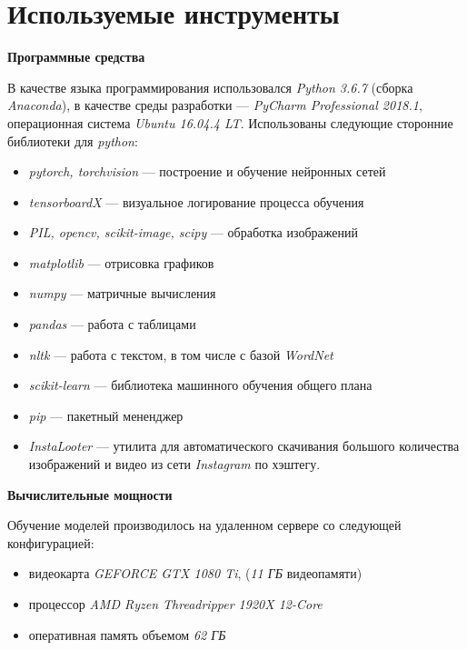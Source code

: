 \section{Используемые инструменты}

\textbf{Программные средства}

\indent
В качестве языка программирования использовался
 \textit{Python 3.6.7} (сборка \textit{Anaconda}),
 в качестве среды разработки --- \textit{PyCharm Professional 2018.1},
 операционная система \textit{Ubuntu 16.04.4 LT}. Использованы
 следующие сторонние библиотеки для \textit{python}:


\begin{itemize}
    \item \textit{pytorch, torchvision} --- построение и обучение нейронных сетей
    \item \textit{tensorboardX} --- визуальное логирование процесса обучения 
    \item \textit{PIL, opencv, scikit-image, scipy} --- обработка изображений
    \item \textit{matplotlib} --- отрисовка графиков
    \item \textit{numpy} --- матричные вычисления
    \item \textit{pandas} --- работа с таблицами
    \item \textit{nltk} --- работа с текстом, в том числе с базой \textit{WordNet}
    \item \textit{scikit-learn} --- библиотека машинного обучения общего плана
    \item \textit{pip} --- пакетный мененджер
    \item \textit{InstaLooter} --- утилита для автоматического скачивания большого
    количества изображений и видео из сети \textit{Instagram} по хэштегу.
    
\end{itemize}


\bigskip


\textbf{Вычислительные мощности}

\indent
\indent
Обучение моделей производилось на удаленном сервере со следующей конфигурацией:
\begin{itemize}
    \item видеокарта \textit{GEFORCE GTX 1080 Ti}, (\textit{11 ГБ} видеопамяти)
    \item процессор \textit{AMD Ryzen Threadripper 1920X 12-Core}
    \item оперативная память объемом  \textit{62 ГБ}
\end{itemize}
